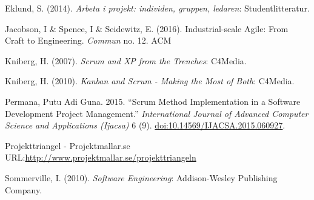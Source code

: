 \documentclass[11pt]{article}
\begin{document}
Eklund, S. (2014). \emph{Arbeta i projekt: individen, gruppen, ledaren}:
Studentlitteratur.

Jacobson, I \& Spence, I \& Seidewitz, E. (2016). Industrial-scale Agile: From Craft to Engineering. \emph{Commun} no. 12. ACM

Kniberg, H. (2007). \emph{Scrum and XP from the Trenches}: C4Media.

Kniberg, H. (2010). \emph{Kanban and Scrum - Making the Most of Both}: C4Media.

Permana, Putu Adi Guna. 2015. “Scrum Method Implementation in a Software
Development Project Management.” \emph{International Journal of Advanced
Computer Science and Applications (Ijacsa)} 6 (9).
\url{doi:10.14569/IJACSA.2015.060927}.

Projekttriangel - Projektmallar.se URL:\url{http://www.projektmallar.se/projekttriangeln}

Sommerville, I. (2010). \emph{Software Engineering}: Addison-Wesley Publishing Company.
\end{document}
